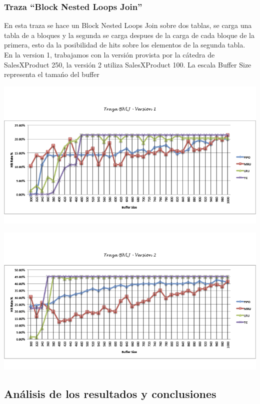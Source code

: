 \subsubsection*{Traza ``Block Nested Loops Join''}
En esta traza se hace un Block Nested Loops Join sobre dos tablas, se carga una tabla de a bloques y la segunda se carga despues de la carga de cada bloque de la primera, esto da la posibilidad de hits sobre los elementos de la segunda tabla. En la version 1, trabajamos con la versi\'on provista por la c\'atedra de SalesXProduct 250, la versi\'on 2 utiliza SalesXProduct 100. La escala Buffer Size representa el tama\'no del buffer
\begin{center}
  \includegraphics[scale=0.6]{img/T3V1.png}
\end{center}  
\begin{center}
  \includegraphics[scale=0.6]{img/T3V2.png}
\end{center}  


\subsection{An\'alisis de los resultados y conclusiones}

